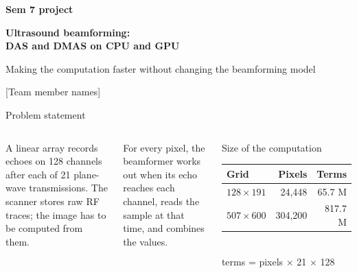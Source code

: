 \documentclass[aspectratio=169,10pt]{beamer}
\begin{document}
\begin{frame}[plain]
  \vspace*{1.3cm}
  \hspace*{.9cm}\begin{minipage}{.85\textwidth}
    {\color{Accent}\small\bfseries Sem 7 project}\par\vspace{.7em}
    {\color{Navy}\fontsize{26}{30}\selectfont\bfseries Ultrasound beamforming:\\ DAS and DMAS on CPU and GPU\par}
    \vspace{.6em}
    {\color{Muted}\large Making the computation faster without changing the beamforming model\par}
    \vspace{1.2cm}
    {\small [Team member names]\par [Course name, institute]}
  \end{minipage}
\end{frame}

\begin{frame}{Problem statement}
  \begin{columns}[T,onlytextwidth]
    A linear array records echoes on 128 channels after each of 21 plane-wave transmissions. The scanner stores raw RF traces; the image has to be computed from them.

    \medskip
    For every pixel, the beamformer works out when its echo reaches each channel, reads the sample at that time, and combines the values.
    \begin{block}{Size of the computation}
      \small
      \begin{tabularx}{\linewidth}{@{}l r r@{}}
        Grid & Pixels & Terms\\\midrule
        $128\times191$ & 24,448 & 65.7 M\\
        $507\times600$ & 304,200 & 817.7 M\\
      \end{tabularx}\\[.3em]
      \scriptsize terms = pixels $\times$ 21 $\times$ 128
    \end{block}
  \end{columns}
\end{frame}
\end{document}
